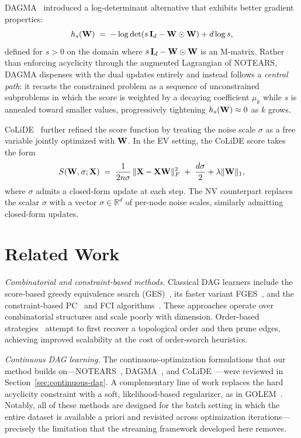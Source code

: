 \documentclass[journal,twoside]{IEEEtran}
\begin{document}
DAGMA~\cite{bello2022dagma} introduced a log-determinant alternative
that exhibits better gradient properties:
\begin{equation}
\label{eq:dagma-h}
h_s({\mathbf W}) \;=\; -\log\det\!\left(s\,{\mathbf I}_d - {\mathbf W} \odot {\ensuremath{\mathbf W}}
\right) + d \log s,
\end{equation}
defined for $s > 0$ on the domain where $s\,{\mathbf I}_d - {\mathbf W} \odot {\ensuremath{\mathbf W}}$
is an M-matrix. Rather than enforcing acyclicity through the augmented
Lagrangian of NOTEARS, DAGMA dispenses with the dual updates entirely
and instead follows a \emph{central path}: it recasts the constrained
problem as a sequence of unconstrained subproblems in which the score
is weighted by a decaying coefficient $\mu_k$ while $s$ is annealed
toward smaller values, progressively tightening $h_s({\mathbf W}) \approx 0$
as $k$ grows.

CoLiDE~\cite{saboksayr2023colide} further refined the score function by
treating the noise scale $\sigma$ as a free variable jointly optimized
with ${\mathbf W}$. In the EV setting, the CoLiDE score takes the form
\begin{equation}
\label{eq:colide-score}
S({\mathbf W}, \sigma; {\mathbf X})
\;=\; \frac{1}{2n\sigma}\,\|{\mathbf X} - {\mathbf X}{\mathbf W}\|_F^2
\;+\; \frac{d\sigma}{2} + \lambda \|{\mathbf W}\|_1,
\end{equation}
where $\sigma$ admits a closed-form update at each step. The NV
counterpart replaces the scalar $\sigma$ with a vector
$\sigma \in \mathbb{R}^d$ of per-node noise scales, similarly
admitting closed-form updates.

\section{Related Work}
\label{sec:related-work}
\textit{Combinatorial and constraint-based methods.} Classical DAG
learners include the score-based greedy equivalence search
(GES)~\cite{chickering2002}, its faster variant FGES~\cite{ramsey2017},
and the constraint-based PC~\cite{spirtes2000causation} and FCI
algorithms~\cite{spirtes1995fci}. These approaches operate over
combinatorial structures and scale poorly with dimension. Order-based
strategies~\cite{topo, permutahedron, two2} attempt to first recover a
topological order and then prune edges, achieving improved scalability
at the cost of order-search heuristics.

\textit{Continuous DAG learning.} The continuous-optimization
formulations that our method builds on---NOTEARS~\cite{zheng2018dags},
DAGMA~\cite{bello2022dagma}, and CoLiDE~\cite{saboksayr2023colide}---were
reviewed in Section~\ref{sec:continuous-dag}. A complementary line of
work replaces the hard acyclicity constraint with a soft, likelihood-based
regularizer, as in GOLEM~\cite{ng2020golem}. Notably, all of these methods
are designed for the batch setting in which the entire dataset is available
a priori and revisited across optimization iterations---precisely the
limitation that the streaming framework developed here removes.
\end{document}
